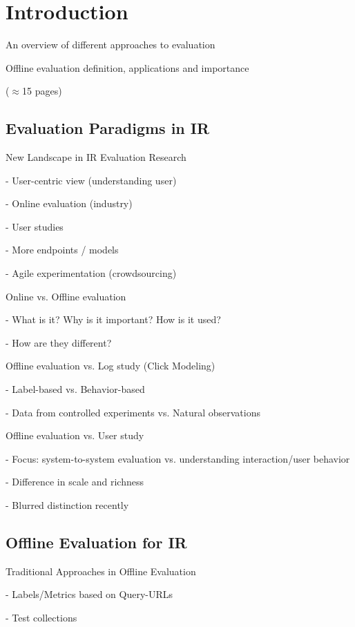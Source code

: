 \documentclass[openany]{now} %
\newcommand{\newpar}{\bigskip\noindent}
\begin{document}
\chapter{Introduction}
\label{c-intro}

An overview of different approaches to evaluation

Offline evaluation definition, applications and importance

(\ensuremath{\approx}15 pages)

\section{Evaluation Paradigms in IR}

\newpar
New Landscape in IR Evaluation Research

- User-centric view (understanding user)

- Online evaluation (industry)

- User studies

- More endpoints / models

- Agile experimentation (crowdsourcing)

\newpar
Online \cite{INR-XYZ} vs. Offline evaluation \cite{INR-009} 

- What is it? Why is it important? How is it used?

- How are they different?


\newpar
Offline evaluation vs. Log study (Click Modeling) \cite{chuklin2015click}

- Label-based vs. Behavior-based

- Data from controlled experiments vs. Natural observations

\newpar
Offline evaluation vs. User study \cite{kelly2009methods}

- Focus: system-to-system evaluation vs. understanding interaction/user behavior

- Difference in scale and richness

- Blurred distinction recently
\cite{Bron:2013}
\cite{Liu:2014}
\cite{Shah:2011}


\section{Offline Evaluation for IR}

Traditional Approaches in Offline Evaluation

- Labels/Metrics based on Query-URLs

- Test collections 
\end{document}
